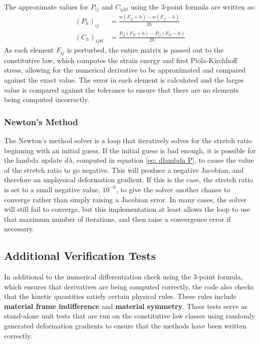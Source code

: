 \documentclass[]{spie}  %
\begin{document}
The approximate values for $P_{ij}$ and $C_{ijkl}$ using the 3-point formula are written as:
\begin{align}
(P_h)_{ij} &= \frac{w(F_{ij} + h) - w(F_{ij} - h)}{2h} \\[1ex]
(C_h)_{ijkl} &= \frac{P_{ij}(F_{kl} + h) - P_{ij}(F_{kl} - h)}{2h}
\end{align}
As each element $F_{ij}$ is perturbed, the entire matrix is passed out to the constitutive law, which computes the strain energy and first Piola-Kirchhoff stress, allowing for the numerical derivative to be approximated and compared against the exact value. The error in each element is calculated and the larges value is compared against the tolerance to ensure that there are no elements being computed incorrectly. 

\subsubsection{Newton's Method}
The Newton's method solver is a loop that iteratively solves for the stretch ratio beginning with an initial guess. If the initial guess is bad enough, it is possible for the lambda update $d\lambda$, computed in equation \ref{eq: dlambda P}, to cause the value of the stretch ratio to go negative. This will produce a negative Jacobian, and therefore an unphysical deformation gradient. If this is the case, the stretch ratio is set to a small negative value, $10^{-6}$, to give the solver another chance to converge rather than simply raising a Jacobian error. In many cases, the solver will still fail to converge, but this implementation at least allows the loop to use that maximum number of iterations, and then raise a convergence error if necessary. 

\subsection{Additional Verification Tests}
\label{sec: verification tests}
In additional to the numerical differentiation check using the 3-point formula, which ensures that derivatives are being computed correctly, the code also checks that the kinetic quantities satisfy certain physical rules. These rules include \textbf{material frame indifference} and \textbf{material symmetry}. These tests serve as stand-alone unit tests that are run on the constitutive law classes using randomly generated deformation gradients to ensure that the methods have been written correctly. 
\end{document}
